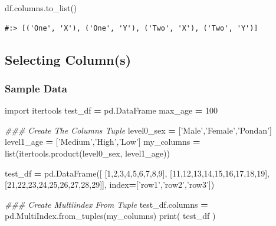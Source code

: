 \documentclass[
]{book}
\newenvironment{Shaded}{\begin{snugshade}}{\end{snugshade}}
\newcommand{\BuiltInTok}[1]{#1}
\newcommand{\CommentTok}[1]{\textcolor[rgb]{0.37,0.37,0.37}{\textit{#1}}}
\newcommand{\DecValTok}[1]{\textcolor[rgb]{0.06,0.06,0.06}{#1}}
\newcommand{\ImportTok}[1]{#1}
\newcommand{\NormalTok}[1]{#1}
\newcommand{\OperatorTok}[1]{\textcolor[rgb]{0.43,0.43,0.43}{\textbf{#1}}}
\newcommand{\StringTok}[1]{\textcolor[rgb]{0.5,0.5,0.5}{#1}}
\begin{document}
\begin{Shaded}
\begin{Highlighting}[]
\NormalTok{df.columns.to_list()}
\end{Highlighting}
\end{Shaded}

\begin{verbatim}
#:> [('One', 'X'), ('One', 'Y'), ('Two', 'X'), ('Two', 'Y')]
\end{verbatim}

\hypertarget{selecting-columns}{%
\subsection{Selecting Column(s)}\label{selecting-columns}}

\hypertarget{sample-data-11}{%
\subsubsection{Sample Data}\label{sample-data-11}}

\begin{Shaded}
\begin{Highlighting}[]
\ImportTok{import}\NormalTok{ itertools}
\NormalTok{test_df }\OperatorTok{=}\NormalTok{ pd.DataFrame}
\NormalTok{max_age }\OperatorTok{=} \DecValTok{100}

\CommentTok{### Create The Columns Tuple}
\NormalTok{level0_sex }\OperatorTok{=}\NormalTok{ [}\StringTok{'Male'}\NormalTok{,}\StringTok{'Female'}\NormalTok{,}\StringTok{'Pondan'}\NormalTok{]}
\NormalTok{level1_age }\OperatorTok{=}\NormalTok{ [}\StringTok{'Medium'}\NormalTok{,}\StringTok{'High'}\NormalTok{,}\StringTok{'Low'}\NormalTok{]}
\NormalTok{my_columns }\OperatorTok{=} \BuiltInTok{list}\NormalTok{(itertools.product(level0_sex, level1_age))}

\NormalTok{test_df }\OperatorTok{=}\NormalTok{ pd.DataFrame([}
\NormalTok{             [}\DecValTok{1}\NormalTok{,}\DecValTok{2}\NormalTok{,}\DecValTok{3}\NormalTok{,}\DecValTok{4}\NormalTok{,}\DecValTok{5}\NormalTok{,}\DecValTok{6}\NormalTok{,}\DecValTok{7}\NormalTok{,}\DecValTok{8}\NormalTok{,}\DecValTok{9}\NormalTok{],}
\NormalTok{             [}\DecValTok{11}\NormalTok{,}\DecValTok{12}\NormalTok{,}\DecValTok{13}\NormalTok{,}\DecValTok{14}\NormalTok{,}\DecValTok{15}\NormalTok{,}\DecValTok{16}\NormalTok{,}\DecValTok{17}\NormalTok{,}\DecValTok{18}\NormalTok{,}\DecValTok{19}\NormalTok{],}
\NormalTok{             [}\DecValTok{21}\NormalTok{,}\DecValTok{22}\NormalTok{,}\DecValTok{23}\NormalTok{,}\DecValTok{24}\NormalTok{,}\DecValTok{25}\NormalTok{,}\DecValTok{26}\NormalTok{,}\DecValTok{27}\NormalTok{,}\DecValTok{28}\NormalTok{,}\DecValTok{29}\NormalTok{]], index}\OperatorTok{=}\NormalTok{[}\StringTok{'row1'}\NormalTok{,}\StringTok{'row2'}\NormalTok{,}\StringTok{'row3'}\NormalTok{])}

\CommentTok{### Create Multiindex From Tuple}
\NormalTok{test_df.columns }\OperatorTok{=}\NormalTok{ pd.MultiIndex.from_tuples(my_columns)}
\BuiltInTok{print}\NormalTok{( test_df ) }
\end{Highlighting}
\end{Shaded}
\end{document}
